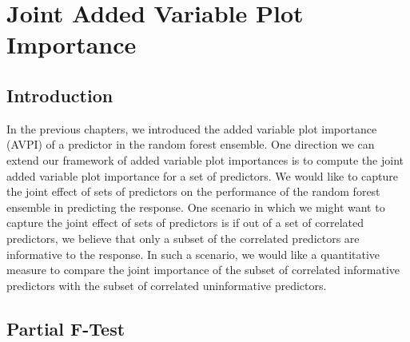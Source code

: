 \documentclass[12pt,twoside]{reedthesis}
\theoremstyle{definition}
\theoremstyle{definition}
\theoremstyle{definition}
\theoremstyle{remark}
\begin{document}
\chapter{Joint Added Variable Plot
Importance}\label{joint-added-variable-plot-importance}

\section{Introduction}\label{introduction-4}

In the previous chapters, we introduced the added variable plot
importance (AVPI) of a predictor in the random forest ensemble. One
direction we can extend our framework of added variable plot importances
is to compute the joint added variable plot importance for a set of
predictors. We would like to capture the joint effect of sets of
predictors on the performance of the random forest ensemble in
predicting the response. One scenario in which we might want to capture
the joint effect of sets of predictors is if out of a set of correlated
predictors, we believe that only a subset of the correlated predictors
are informative to the response. In such a scenario, we would like a
quantitative measure to compare the joint importance of the subset of
correlated informative predictors with the subset of correlated
uninformative predictors. \par

\section{Partial F-Test}\label{partial-f-test}
\end{document}
